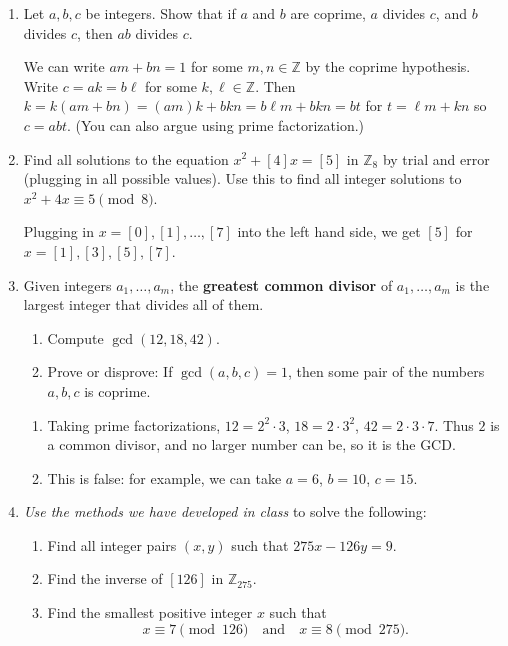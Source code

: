 \documentclass{amsart}
\def\Z{\mathbb Z}
\begin{document}
\begin{enumerate}

\item Let $a,b,c$ be integers. Show that if $a$ and $b$ are coprime, $a$ divides $c$, and $b$ divides $c$, then $ab$ divides $c$.


\begin{framed}
We can write $am+bn=1$ for some $m,n\in \Z$ by the coprime hypothesis. Write $c=ak=b\ell$ for some $k,\ell\in \Z$. Then $k = k(am+bn) = (am)k+bkn= b\ell m + bkn = bt$ for $t=\ell m + kn$ so $c=abt$. (You can also argue using prime factorization.)
\end{framed}

\item Find all solutions to the equation $x^2 + [4]x = [5]$ in $\Z_8$ by trial and error (plugging in all possible values). Use this to find all integer solutions to $x^2+ 4x \equiv 5 \pmod 8$.

\begin{framed}
Plugging in $x= [0], [1], \dots, [7]$ into the left hand side, we get $[5]$ for $x=[1],[3],[5],[7]$.
\end{framed}

\item  Given integers $a_1,\dots,a_m$, the \textbf{greatest common divisor} of $a_1,\dots,a_m$ is the largest integer that divides all of them. 
\begin{enumerate}
\item Compute $\gcd(12,18,42)$.
\item Prove or disprove: If $\gcd(a,b,c) = 1$, then some pair of the numbers $a,b,c$ is coprime.
\end{enumerate}

\begin{framed}
\begin{enumerate}
\item Taking prime factorizations, $12 = 2^2 \cdot 3$, $18 = 2 \cdot 3^2$, $42 = 2 \cdot 3 \cdot 7$. Thus $2$ is a common divisor, and no larger number can be, so it is the GCD. 
\item This is false: for example, we can take $a=6$, $b=10$, $c=15$.
\end{enumerate}
\end{framed}

\item \emph{Use the methods we have developed in class} to solve the following:
\begin{enumerate}
\item Find all integer pairs $(x,y)$ such that $275x-126y=9$.
\item Find the inverse of $[126]$ in $\Z_{275}$.
\item Find the smallest positive integer $x$ such that 
\[ x\equiv 7 \pmod{126} \quad\text{and}\quad x\equiv 8 \pmod{275}.\]
\end{enumerate}



\end{enumerate}
\end{document}
